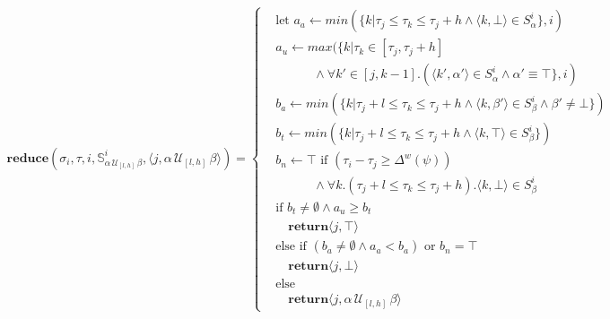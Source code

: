 \documentclass[]{../llncs/llncs}
\newcommand{\rp}[2]{\ensuremath{\langle #1, #2 \rangle}}
\begin{document}
\begin{align*}
\mathbf{reduce}(\sigma_i,\tau, i,\mathbb{S}^i_{\alpha\, \mathcal{U}_{[l,h]}\, \beta} ,\rp{j}{\alpha\, \mathcal{U}_{[l,h]}\, \beta}) = \left\{
\begin{aligned}
&\text{let } a_a \leftarrow min(\{k | \tau_j \leq \tau_k \leq \tau_j+h  \wedge \rp{k}{\bot} \in S^i_\alpha \},i) \\ 
& a_u \leftarrow max(\{k| \tau_k \in [\tau_j,\tau_j+h] \\
& \quad \quad \quad \wedge \forall k' \in [j,k-1].(\rp{k'}{\alpha'} \in S^i_\alpha \wedge \alpha' \equiv \top\},i) \\
& b_a \leftarrow min(\{k | \tau_j+l \leq \tau_k \leq \tau_j+h \wedge \rp{k}{\beta'} \in S^i_\beta \wedge \beta' \neq \bot\}) \\ 
&b_t \leftarrow min(\{k | \tau_j+l \leq \tau_k \leq \tau_j+h \wedge \rp{k}{\top} \in S^i_{\beta} \}) \\
&b_n \leftarrow \top \text{ if } (\tau_i - \tau_j \geq \Delta^w(\psi)) \\
& \quad \quad \quad \wedge \forall k.(\tau_j+l \leq \tau_k \leq \tau_j+h). \rp{k}{\bot} \in S^i_{\beta} \\
&\text{if } b_t \neq \emptyset \wedge a_u \geq b_t \\
& \quad\mathbf{return} \rp{j}{\top} \\
&\text{else if } (b_a \neq \emptyset \wedge a_a < b_a) \text{ or } b_n = \top\\ & \quad\mathbf{return} \rp{j}{\bot} \\
&\text{else} \\
& \quad\mathbf{return} \rp{j}{\alpha\, \mathcal{U}_{[l,h]}\, \beta}
\end{aligned} \right. \\
\end{align*}
\end{document}
